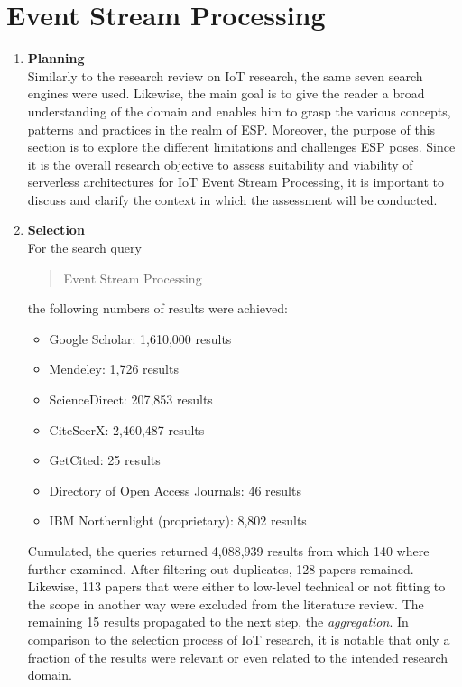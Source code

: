 \section{Event Stream Processing}

\begin{enumerate}
    \item
    \textbf{Planning}\\
    Similarly to the research review on \acf{IoT} research, the same seven search engines were used. Likewise, the main goal is to give the reader a broad understanding of the domain and enables him to grasp the various concepts, patterns and practices in the realm of \acf{ESP}. Moreover, the purpose of this section is to explore the different limitations and challenges \acf{ESP} poses. Since it is the overall research objective to assess suitability and viability of serverless architectures for IoT Event Stream Processing, it is important to discuss and clarify the context in which the assessment will be conducted. 
    
    \item
    \textbf{Selection}\\
    For the search query \blockquote{Event Stream Processing} the following numbers of results were achieved:
    
    \begin{itemize}
        \renewcommand\labelitemi{--}
        \item Google Scholar:  1,610,000 results
        \item Mendeley: 1,726 results
        \item ScienceDirect: 207,853 results
        \item CiteSeerX: 2,460,487 results
        \item GetCited: 25 results
        \item Directory of Open Access Journals: 46 results
        \item IBM Northernlight (proprietary): 8,802  results
    \end{itemize}
    
    Cumulated, the queries returned 4,088,939 results from which 140 where further examined. After filtering out duplicates, 128 papers remained. Likewise, 113 papers that were either to low-level technical or not fitting to the scope in another way were excluded from the literature review. The remaining 15 results propagated to the next step, the \textit{aggregation}. In comparison to the selection process of IoT research, it is notable that only a fraction of the results were relevant or even related to the intended research domain.
    

\end{enumerate}
